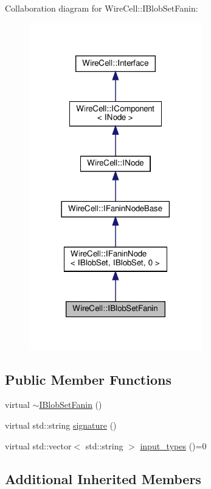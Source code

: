 Collaboration diagram for Wire\+Cell\+:\+:I\+Blob\+Set\+Fanin\+:
\nopagebreak
\begin{figure}[H]
\begin{center}
\leavevmode
\includegraphics[width=213pt]{class_wire_cell_1_1_i_blob_set_fanin__coll__graph}
\end{center}
\end{figure}
\subsection*{Public Member Functions}
\begin{DoxyCompactItemize}
\item 
virtual \hyperlink{class_wire_cell_1_1_i_blob_set_fanin_a7bac3d272182126348327a68f430bbd9}{$\sim$\+I\+Blob\+Set\+Fanin} ()
\item 
virtual std\+::string \hyperlink{class_wire_cell_1_1_i_blob_set_fanin_a8649f2b27c10e56d730d47357caa36cc}{signature} ()
\item 
virtual std\+::vector$<$ std\+::string $>$ \hyperlink{class_wire_cell_1_1_i_blob_set_fanin_a1783b57125c4b9df55a828ec832dbb72}{input\+\_\+types} ()=0
\end{DoxyCompactItemize}
\subsection*{Additional Inherited Members}


